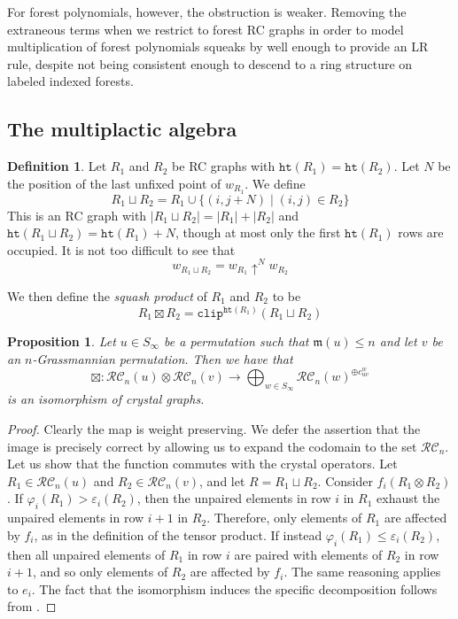 \documentclass{amsart}
\newtheorem{proposition}[lemma]{Proposition}
\theoremstyle{definition}
\newtheorem{definition}[lemma]{Definition}
\theoremstyle{remark}
\numberwithin{equation}{subsection}
\newcommand{\shup}{{\uparrow}}
\newcommand{\wof}[1]{w_{#1}}
\newcommand{\hr}{\mathtt{ht}}
\newcommand{\clp}{\mathtt{clip}}
\newcommand{\RC}{\mathcal{RC}}
\newcommand{\maxd}{\mathfrak{m}}
\begin{document}
For forest polynomials, however, the obstruction is weaker. Removing the extraneous terms when we restrict to forest RC graphs in order to model multiplication of forest polynomials squeaks by well enough to provide an LR rule, despite not being consistent enough to descend to a ring structure on labeled indexed forests.


\subsection{The multiplactic algebra}\label{section:multiplactic}
\begin{definition}
Let $R_1$ and $R_2$ be RC graphs with $\hr(R_1)=\hr(R_2)$. Let $N$ be the position of the last unfixed point of $\wof{R_1}$. We define
$$R_1\sqcup R_2 = R_1\cup \{(i,j+N)\mid (i,j)\in R_2\}$$
This is an RC graph with $|R_1\sqcup R_2| = |R_1| + |R_2|$ and $\hr(R_1\sqcup R_2)=\hr(R_1) + N$, though at most only the first $\hr(R_1)$ rows are occupied.  It is not too difficult to see that
$$\wof{R_1\sqcup R_2} = \wof{R_1}\shup^{N}\wof{R_2}$$

We then define the \emph{squash product} of $R_1$ and $R_2$ to be
$$R_1\boxtimes R_2 = \clp^{\hr(R_1)}(R_1\sqcup R_2)$$

\end{definition}

\begin{proposition} \label{proposition:boxproduct}
  Let $u\in S_\infty$ be a permutation such that $\maxd(u)\leq n$ and let $v$ be an $n$-Grassmannian permutation. Then we have that
  $$\boxtimes:\RC_n(u)\otimes \RC_n(v)\to \bigoplus_{w\in S_\infty} \RC_n(w)^{\oplus c_{uv}^w}$$
  is an isomorphism of crystal graphs. 
\end{proposition}
\begin{proof}
Clearly the map is weight preserving. We defer the assertion that the image is precisely correct by allowing us to expand the codomain to the set $\RC_n$. 
Let us show that the function commutes with the crystal operators. Let $R_1\in \RC_n(u)$ and $R_2\in \RC_n(v)$, and let $R=R_1\sqcup R_2$. Consider $f_i(R_1\otimes R_2)$. If $\varphi_i(R_1)>\varepsilon_i(R_2)$, then the unpaired elements in row $i$ in $R_1$ exhaust the unpaired elements in row $i+1$ in $R_2$. Therefore, only elements of $R_1$ are affected by $f_i$, as in the definition of the tensor product. If instead $\varphi_i(R_1)\leq \varepsilon_i(R_2)$, then all unpaired elements of $R_1$ in row $i$ are paired with elements of $R_2$ in row $i+1$, and so only elements of $R_2$ are affected by $f_i$. The same reasoning applies to $e_i$. The fact that the isomorphism induces the specific decomposition follows from \cite{kouno2020decomposition}.
\end{proof}
\end{document}
